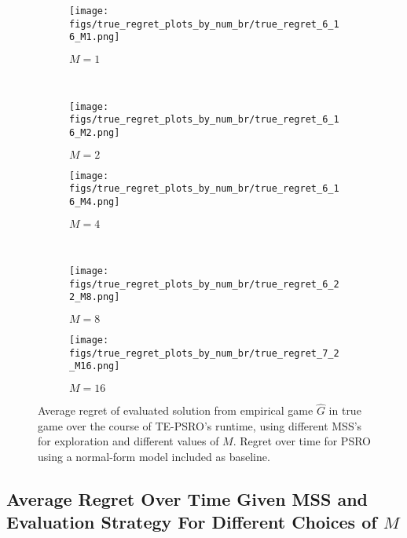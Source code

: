 \begin{figure}[H]
    \centering
    \begin{subfigure}[b]{0.48\textwidth}
    \texttt{[image: figs/true\_regret\_plots\_by\_num\_br/true\_regret\_6\_16\_M1.png]}
    \caption{$M = 1$}
    \label{fig:app_regret_M1}
    \end{subfigure}~
    \begin{subfigure}[b]{0.48\textwidth}
    \texttt{[image: figs/true\_regret\_plots\_by\_num\_br/true\_regret\_6\_16\_M2.png]}
    \caption{$M = 2$}
    \label{fig:app_regret_M2}
    \end{subfigure}
    \begin{subfigure}[b]{0.48\textwidth}
    \texttt{[image: figs/true\_regret\_plots\_by\_num\_br/true\_regret\_6\_16\_M4.png]}
    \caption{$M = 4$}
    \label{fig:app_regret_M4}
    \end{subfigure}~
    \begin{subfigure}[b]{0.48\textwidth}
    \texttt{[image: figs/true\_regret\_plots\_by\_num\_br/true\_regret\_6\_22\_M8.png]}
    \caption{$M = 8$}
    \label{fig:app_regret_M8}
    \end{subfigure}
    \begin{subfigure}[b]{0.48\textwidth}
    \texttt{[image: figs/true\_regret\_plots\_by\_num\_br/true\_regret\_7\_2\_M16.png]}
    \caption{$M = 16$}
    \label{fig:app_regret_M16}
    \end{subfigure}
    \caption{Average regret of evaluated solution from empirical game $\hat{G}$ in true game over the course of TE-PSRO's runtime, using different MSS's for exploration and different values of $M$. Regret over time for PSRO using a normal-form model included as baseline.}
    \label{fig:app_true_regret}
\end{figure}
\newpage
\subsection{Average Regret Over Time Given MSS and Evaluation Strategy For Different Choices of $M$}


